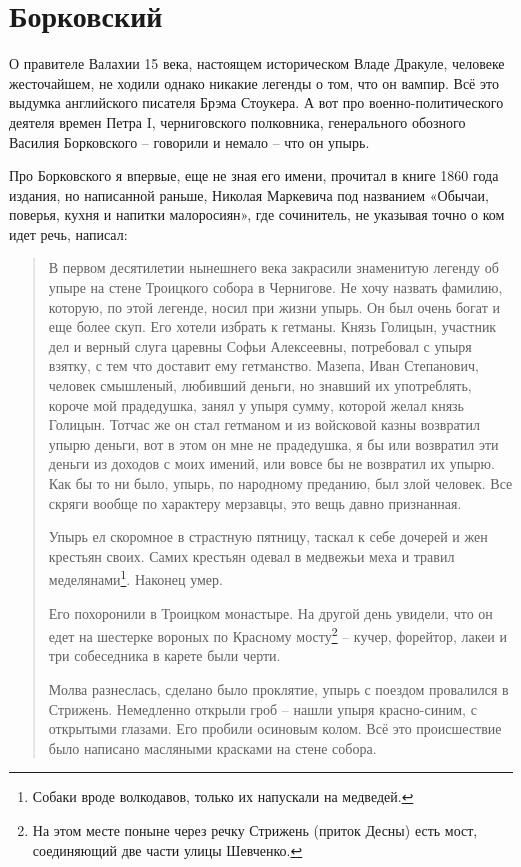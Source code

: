 \documentclass[a5paper,11pt,openany]{article}
\begin{document}
 


\section{Борковский}
  
   О правителе Валахии 15 века, настоящем историческом Владе Дракуле, человеке жесточайшем, не ходили однако никакие легенды о том, что он вампир. Всё это выдумка английского писателя Брэма Стоукера. А вот про военно-политического деятеля времен Петра I, черниговского полковника, генерального обозного Василия Борковского – говорили и немало – что он упырь.

   Про Борковского я впервые, еще не зная его имени, прочитал в книге 1860 года издания, но написанной раньше, Николая Маркевича под названием «Обычаи, поверья, кухня и напитки малоросиян»\cite{mark}, где сочинитель, не указывая точно о ком идет речь, написал:

\begin{quotation}
В первом десятилетии нынешнего века закрасили знаменитую легенду об упыре на стене Троицкого собора в Чернигове. Не хочу назвать фамилию, которую, по этой легенде, носил при жизни упырь. Он был очень богат и еще более скуп. Его хотели избрать к гетманы. Князь Голицын, участник дел и верный слуга царевны Софьи Алексеевны, потребовал с упыря взятку, с тем что доставит ему гетманство.
Мазепа, Иван Степанович, человек смышленый, любивший деньги, но знавший их употреблять, короче мой прадедушка, занял у упыря сумму, которой желал князь Голицын. Тотчас же он стал гетманом и из войсковой казны возвратил упырю деньги, вот в этом он мне не прадедушка, я бы или возвратил эти деньги из доходов с моих имений, или вовсе бы не возвратил их упырю.
Как бы то ни было, упырь, по народному преданию, был злой человек. Все скряги вообще по характеру мерзавцы, это вещь давно признанная.

Упырь ел скоромное в страстную пятницу, таскал к себе дочерей и жен крестьян своих. Самих крестьян одевал в медвежьи меха и травил меделянами\footnote{Собаки вроде волкодавов, только их напускали на медведей.}. Наконец умер.

Его похоронили в Троицком монастыре.
На другой день увидели, что он едет на шестерке вороных по Красному мосту\footnote{На этом месте поныне через речку Стрижень (приток Десны) есть мост, соединяющий две части улицы Шевченко.} – кучер, форейтор, лакеи и три собеседника в карете были черти.

Молва разнеслась, сделано было проклятие, упырь с поездом провалился в Стрижень. Немедленно открыли гроб – нашли упыря красно-синим, с открытыми глазами. Его пробили осиновым колом. Всё это происшествие было написано масляными красками на стене собора.
\end{quotation}
\end{document}
